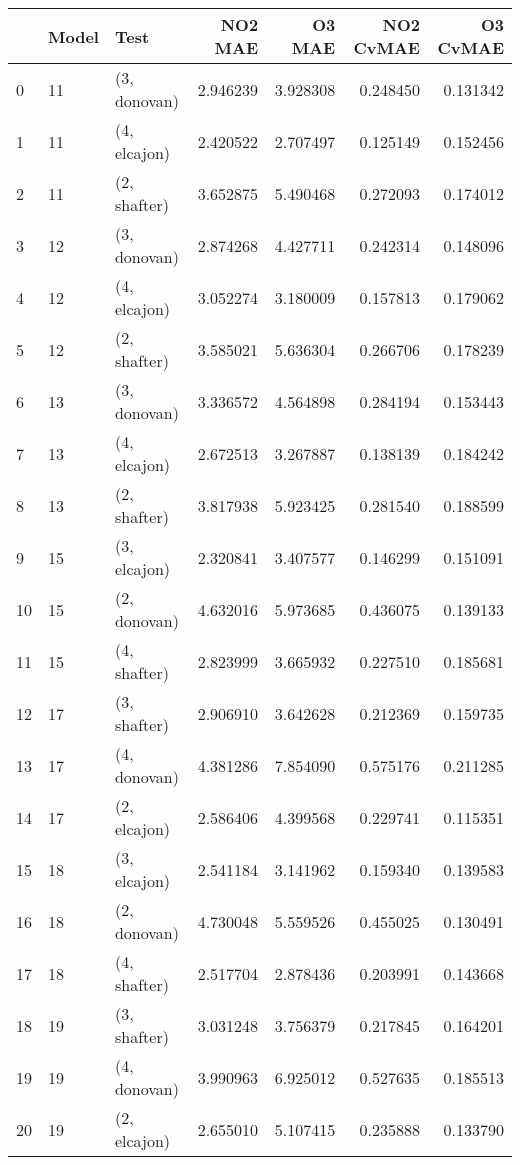 \begin{tabular}{lllrrrr}
\toprule
{} & Model &          Test &   NO2 MAE &    O3 MAE &  NO2 CvMAE &  O3 CvMAE \\
\midrule
0  &    11 &  (3, donovan) &  2.946239 &  3.928308 &   0.248450 &  0.131342 \\
1  &    11 &  (4, elcajon) &  2.420522 &  2.707497 &   0.125149 &  0.152456 \\
2  &    11 &  (2, shafter) &  3.652875 &  5.490468 &   0.272093 &  0.174012 \\
3  &    12 &  (3, donovan) &  2.874268 &  4.427711 &   0.242314 &  0.148096 \\
4  &    12 &  (4, elcajon) &  3.052274 &  3.180009 &   0.157813 &  0.179062 \\
5  &    12 &  (2, shafter) &  3.585021 &  5.636304 &   0.266706 &  0.178239 \\
6  &    13 &  (3, donovan) &  3.336572 &  4.564898 &   0.284194 &  0.153443 \\
7  &    13 &  (4, elcajon) &  2.672513 &  3.267887 &   0.138139 &  0.184242 \\
8  &    13 &  (2, shafter) &  3.817938 &  5.923425 &   0.281540 &  0.188599 \\
9  &    15 &  (3, elcajon) &  2.320841 &  3.407577 &   0.146299 &  0.151091 \\
10 &    15 &  (2, donovan) &  4.632016 &  5.973685 &   0.436075 &  0.139133 \\
11 &    15 &  (4, shafter) &  2.823999 &  3.665932 &   0.227510 &  0.185681 \\
12 &    17 &  (3, shafter) &  2.906910 &  3.642628 &   0.212369 &  0.159735 \\
13 &    17 &  (4, donovan) &  4.381286 &  7.854090 &   0.575176 &  0.211285 \\
14 &    17 &  (2, elcajon) &  2.586406 &  4.399568 &   0.229741 &  0.115351 \\
15 &    18 &  (3, elcajon) &  2.541184 &  3.141962 &   0.159340 &  0.139583 \\
16 &    18 &  (2, donovan) &  4.730048 &  5.559526 &   0.455025 &  0.130491 \\
17 &    18 &  (4, shafter) &  2.517704 &  2.878436 &   0.203991 &  0.143668 \\
18 &    19 &  (3, shafter) &  3.031248 &  3.756379 &   0.217845 &  0.164201 \\
19 &    19 &  (4, donovan) &  3.990963 &  6.925012 &   0.527635 &  0.185513 \\
20 &    19 &  (2, elcajon) &  2.655010 &  5.107415 &   0.235888 &  0.133790 \\

\end{tabular}
